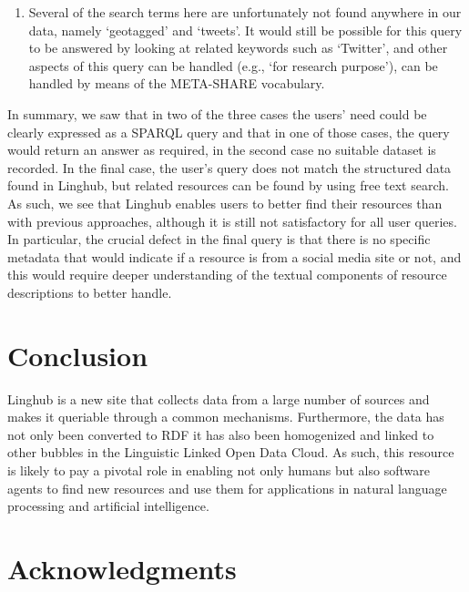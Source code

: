 \documentclass{acm_proc_article-sp}
\begin{document}
\begin{enumerate}
\item {}

Several of the search terms here are unfortunately not found anywhere in our
data, namely `geotagged' and `tweets'. It would still be possible for this query
to be answered by looking at related keywords such as `Twitter', and other
aspects of this query can be handled (e.g., `for research purpose'), can be
handled by means of the META-SHARE vocabulary.

\end{enumerate}

In summary, we saw that in two of the three cases the users' need could be
clearly expressed as a SPARQL query and that in one of those cases, the query
would return an answer as required, in the second case no suitable dataset is
recorded. In the final case, the user's query does not match the structured data
found in Linghub, but related resources can be found by using free text search. 
As such, we see that Linghub enables users to better find their resources than
with previous approaches, although it is still not satisfactory for all user
queries. In particular, the crucial defect in the final query is that there is
no specific metadata that would indicate if a resource is from a social media
site or not, and this would require deeper understanding of the textual components
of resource descriptions to better handle.

\section{Conclusion}

\label{sec:conclusion}

Linghub is a new site that collects data from a large number of sources and
makes it queriable through a common mechanisms. Furthermore, the data has not
only been converted to RDF it has also been homogenized and linked to other
bubbles in the Linguistic Linked Open Data Cloud. As such, this resource is
likely to pay a pivotal role in enabling not only humans but also software
agents to find new resources and use them for applications in natural language
processing and artificial intelligence.

\section*{Acknowledgments}
\end{document}

